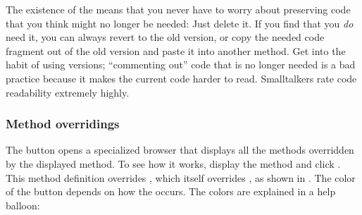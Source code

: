 \documentclass[a4paper,10pt,twoside]{book}
\begin{document}
The existence of the  means that you never have to worry about preserving code that you think might no longer be needed:
Just delete it.
If you find that you \emph{do} need it, you can always revert to the old version, or copy the needed code fragment out of the old version and paste it into another method.
Get into the habit of using versions; ``commenting out'' code that is no longer needed is a bad practice because it makes the current code harder to read.
Smalltalkers rate code readability extremely highly.


\subsubsection{Method overridings}
\label{sec:overriding}

The  button opens a specialized browser that displays all the methods overridden by the displayed method.
To see how it works, display the  method and click .
This method definition overrides \mbox{,} which itself overrides , as shown in .
The color of the  button depends on how the  occurs.
The colors are explained in a help balloon:


\end{document}

